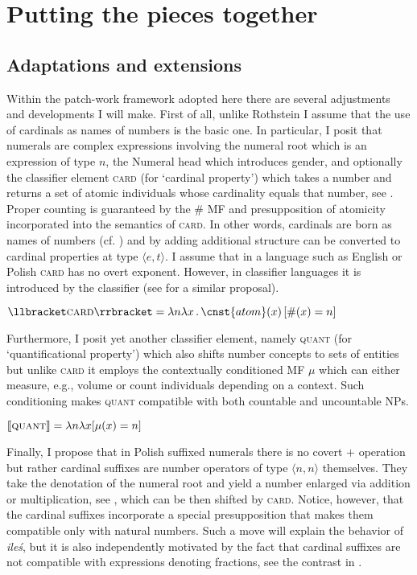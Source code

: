 \documentclass[output=paper,
]{langscibook}
\begin{document}
	\section{Putting the pieces together}\label{sec:putting-pieces-together}
	
	\subsection{Adaptations and extensions}\label{sec:adaptations-and-extensions}
	
	
	Within the patch-work framework adopted here there are several adjustments and developments I will make. First of all, unlike Rothstein I assume that the use of cardinals as names of numbers is the basic one. In particular, I posit that numerals are complex expressions involving the numeral root which is an expression of type $n$, the Numeral head which introduces gender, and optionally the classifier element \textsc{card} (for `cardinal property') which takes a number and returns a set of atomic individuals whose cardinality equals that number, see . Proper counting is guaranteed by the $\#$ MF and presupposition of atomicity incorporated into the semantics of \textsc{card}. In other words, cardinals are born as names of numbers (cf. \citealt{scha1981distributive}) and by adding additional structure can be converted to cardinal properties at type $\langle e,t\rangle$. I assume that in a language such as English or Polish \textsc{card} has no overt exponent. However, in classifier languages it is introduced by the classifier (see \citealt{sudo2016semantic} for a similar proposal).

	\ea $\llbracket\textsc{card}\rrbracket=\lambda n\lambda x\,.\,\cnst{atom}(x)\,[\#(x)=n]$\label{ex:card}
	\z

\noindent Furthermore, I posit yet another classifier element, namely \textsc{quant} (for `quantificational property') which also shifts number concepts to sets of entities but unlike \textsc{card} it employs the contextually conditioned MF $\mu$ which can either measure, e.g., volume or count individuals depending on a context. Such conditioning makes \textsc{quant} compatible with both countable and uncountable NPs.

	\ea $\llbracket\textsc{quant}\rrbracket=\lambda n\lambda x[\mu(x)=n]$\label{ex:quant}
	\z

\noindent Finally, I propose that in Polish suffixed numerals there is no covert $+$ operation but rather cardinal suffixes are number operators of type $\langle n,n\rangle$ themselves. They take the denotation of the numeral root and yield a number enlarged via addition or multiplication, see , which can be then shifted by \textsc{card}. Notice, however, that the cardinal suffixes incorporate a special presupposition that makes them compatible only with natural numbers. Such a move will explain the behavior of \textit{ileś}, but it is also independently motivated by the fact that cardinal suffixes are not compatible with expressions denoting fractions, see the contrast in .
\end{document}
